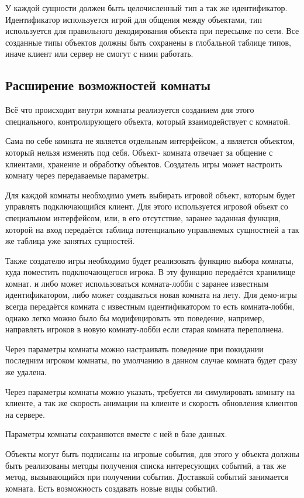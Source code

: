 \documentclass[a4paper,14pt, openany]{book}
\begin{document}
У каждой сущности должен быть целочисленный тип а так же идентификатор. Идентификатор используется игрой для общения между объектами, тип используется для правильного декодирования объекта при пересылке по сети. Все созданные типы объектов должны быть сохранены в глобальной таблице типов, иначе клиент или сервер не смогут с ними работать.

\subsection{Расширение возможностей комнаты}

Всё что происходит внутри комнаты реализуется созданием для этого специального, контролирующего объекта, который взаимодействует с комнатой. 

Сама по себе комната не является отдельным интерфейсом, а является объектом, который нельзя изменять под себя. Объект- комната отвечает за общение с клиентами, хранение и обработку объектов. Создатель игры может настроить комнату через передаваемые параметры.

Для каждой комнаты необходимо уметь выбирать игровой объект, которым будет управлять подключающийся клиент. Для этого используется игровой объект со специальном интерфейсом, или, в его отсутствие, заранее заданная функция, которой на вход передаётся таблица потенциально управляемых сущностней а так же таблица уже занятых сущностей.  

Также создателю игры необходимо будет реализовать функцию выбора комнаты, куда поместить подключающегося игрока. В эту функцию передаётся хранилище комнат. и либо может использоваться комната-лобби с заранее известным идентификатором, либо может создаваться новая комната на лету. Для демо-игры всегда передаётся комната с известным идентификатором то есть комната-лобби, однако легко можно было бы модифицировать это поведение, например, направлять игроков в новую комнату-лобби если старая комната переполнена. 

Через параметры комнаты можно настраивать поведение при покидании последним игроком комнаты, по умолчанию в данном случае комната будет сразу же удалена. 

Через параметры комнаты можно указать, требуется ли симулировать комнату на клиенте, а так же скорость анимации на клиенте и скорость обновления клиентов на сервере.

Параметры комнаты сохраняются вместе с ней в базе данных.

Объекты могут быть подписаны на игровые события, для этого у объекта должны быть реализованы методы получения списка интересующих событий, а так же метод, вызывающийся при получении события. Доставкой событий занимается комната. Есть возможность создавать новые виды событий. 
\end{document}

